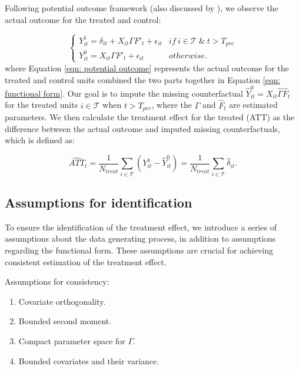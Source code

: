 \documentclass[12pt]{article}
\begin{document}
Following \cite{splawa1990application} potential outcome framework (also discussed by \cite{rubin1974estimating, rubin2005causal}), we observe the actual outcome for the treated and control:

\begin{equation}
\label{eqn: potential outcome}
\begin{cases}
      Y_{it}^1 = \delta_{it} + X_{it} \Gamma F'_t + \epsilon_{it} & if \ i \in \mathcal{T} \ \& \ t > T_{pre} \\
      Y_{it}^0 = X_{it} \Gamma F'_t + \epsilon_{it} & otherwise.
\end{cases}
\end{equation}
where Equation \ref{eqn: potential outcome} represents the actual outcome for the treated and control units combined the two parts together in Equation \ref{eqn: functional form}. Our goal is to impute the missing counterfactual $\hat{Y}_{it}^0 = X_{it} \hat{\Gamma} \hat{F}_t$ for the treated units $i \in \mathcal{T}$ when $t > T_{pre}$, where the $\hat{\Gamma}$ and $\hat{F}_t$ are estimated parameters. We then calculate the treatment effect for the treated (ATT) as the difference between the actual outcome and imputed missing counterfactuals, which is defined as:

\begin{equation}
\widehat{ATT}_{t} = \frac{1}{N_{treat}}\sum_{i \in \mathcal{T}} \left( Y_{it}^1 - \hat{Y}_{it}^0 \right) = \frac{1}{N_{treat}}\sum_{i \in \mathcal{T}}\hat{\delta}_{it}.
\end{equation}
\subsection{Assumptions for identification}

To ensure the identification of the treatment effect, we introduce a series of assumptions about the data generating process, in addition to assumptions regarding the functional form. These assumptions are crucial for achieving consistent estimation of the treatment effect.

\begin{assumption}
\label{ass: consistency}
Assumptions for consistency:
\begin{enumerate}
\item Covariate orthogonality.
\item Bounded second moment.
\item Compact parameter space for $\Gamma$. 
\item Bounded covariates and their variance. 
\end{enumerate}
\end{assumption}
\end{document}
